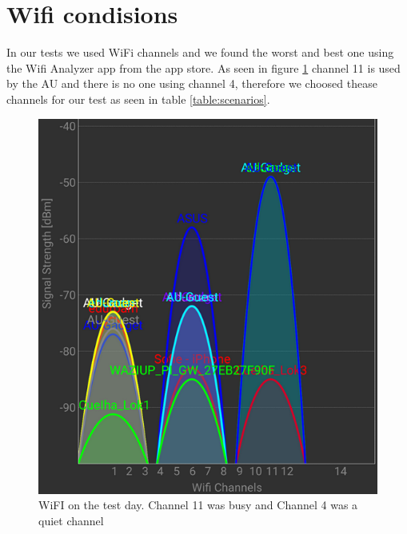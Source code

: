 \section{Wifi condisions}\label{sc:wifi}
In our tests we used WiFi channels and we found the worst and best one using the 
Wifi Analyzer app from the app store\cite{Farproc@gmail.com2018}. As seen in figure \ref{fig:wifionthetestday} channel 11 is used by the AU and there is no one using channel 4, therefore we choosed thease channels for our test as seen in table \ref{table:scenarios}.
\begin{figure}[H]
	\centering
	\includegraphics[width=1\linewidth]{testAndPerformance/wifi/wifiOnTheTestDay}
	\caption{WiFI on the test day. Channel 11 was busy and Channel 4 was a quiet channel}
	\label{fig:wifionthetestday}
\end{figure}
